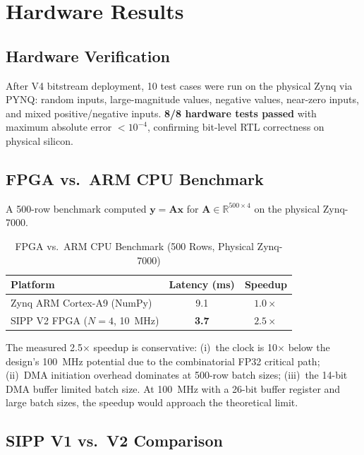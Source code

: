 \documentclass[journal,a4paper]{IEEEtran}
\begin{document}
\section{Hardware Results}

\subsection{Hardware Verification}

After V4 bitstream deployment, 10 test cases were run on the physical
Zynq via PYNQ: random inputs, large-magnitude values, negative values,
near-zero inputs, and mixed positive/negative inputs.
\textbf{8/8 hardware tests passed} with maximum absolute error
$< 10^{-4}$, confirming bit-level RTL correctness on physical silicon.

\subsection{FPGA vs.\ ARM CPU Benchmark}

A 500-row benchmark computed $\mathbf{y}=\mathbf{A}\mathbf{x}$ for
$\mathbf{A}\in\mathbb{R}^{500\times4}$ on the physical Zynq-7000.

\begin{table}[!t]
\centering
\caption{FPGA vs.\ ARM CPU Benchmark (500 Rows, Physical Zynq-7000)}
\label{tab:hw_bench}
\begin{tabular}{lcc}
\toprule
\textbf{Platform} & \textbf{Latency (ms)} & \textbf{Speedup} \\
\midrule
Zynq ARM Cortex-A9 (NumPy) & 9.1 & $1.0\times$ \\
SIPP V2 FPGA ($N=4$, 10~MHz) & \textbf{3.7} & $\mathbf{2.5\times}$ \\
\bottomrule
\end{tabular}
\end{table}

The measured 2.5$\times$ speedup is conservative: (i)~the clock is
10$\times$ below the design's 100~MHz potential due to the
combinatorial FP32 critical path; (ii)~DMA initiation overhead dominates
at 500-row batch sizes; (iii)~the 14-bit DMA buffer limited batch size.
At 100~MHz with a 26-bit buffer register and large batch sizes, the
speedup would approach the theoretical limit.

\subsection{SIPP V1 vs.\ V2 Comparison}
\end{document}
